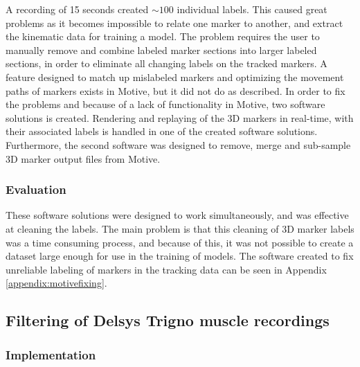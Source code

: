\documentclass[../main.tex]{subfiles}
\begin{document}
A recording of 15 seconds created $\sim 100$ individual labels.
This caused great problems as it becomes impossible to relate one marker to another, and extract the kinematic data for training a model.
The problem requires the user to manually remove and combine labeled marker sections into larger labeled sections, in order to eliminate all changing labels on the tracked markers.
A feature designed to match up mislabeled markers and optimizing the movement paths of markers exists in Motive, but it did not do as described.
In order to fix the problems and because of a lack of functionality in Motive, two software solutions is created.
Rendering and replaying of the 3D markers in real-time, with their associated labels is handled in one of the created software solutions.
Furthermore, the second software was designed to remove, merge and sub-sample 3D marker output files from Motive.

\subsubsection{Evaluation}

These software solutions were designed to work simultaneously, and was effective at cleaning the labels.
The main problem is that this cleaning of 3D marker labels was a time consuming process, and because of this, it was not possible to create a dataset large enough for use in the training of models.
The software created to fix unreliable labeling of markers in the tracking data can be seen in Appendix \ref{appendix:motivefixing}.

\subsection{Filtering of Delsys Trigno muscle recordings}

\subsubsection{Implementation}
\end{document}
